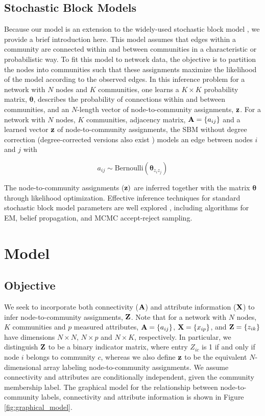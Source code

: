 \documentclass[10pt,journal,compsoc]{IEEEtran}
\begin{document}
\subsection{Stochastic Block Models}
Because our model is an extension to the widely-used stochastic block model \cite{sbmOrig}, we provide a brief introduction here. This model assumes that edges within a community are connected within and between communities in a characteristic or probabilistic way. To fit this model to network data, the objective is to partition the nodes into communities such that these assignments maximize the likelihood of the model according to the observed edges. In this inference problem for a network with $N$ nodes and $K$ communities, one learns a $K \times K$ probability matrix, ${\boldsymbol \theta}$, describes the probability of connections within and between communities, and an $N$-length vector of node-to-community assignments, ${\bf z}$. For a network with $N$ nodes, $K$ communities, adjacency matrix, ${\bf A}=\{a_{ij}\}$ and a learned vector ${\bf z}$ of node-to-community assignments, the SBM without degree correction (degree-corrected versions also exist \cite{degreeCorrect}) models an edge between nodes $i$ and $j$ with

\begin{equation}
a_{ij} \sim \text{Bernoulli}(\boldsymbol \theta_{z_{i}z_{j}})
\end{equation}

The node-to-community assignments (${\bf z})$ are inferred together with the matrix ${\boldsymbol \theta}$ through likelihood optimization. Effective inference techniques for standard stochastic block model parameters are well explored \cite{comparative,tiagomcmc,dudin}, including algorithms for EM, belief propagation, and MCMC accept-reject sampling. 

\section{Model}
\subsection{Objective}
We seek to incorporate both connectivity (${\bf A}$) and attribute information (${\bf X}$) to infer node-to-community assignments, ${\bf Z}$. Note that for a network with $N$ nodes, $K$ communities and $p$ measured attributes, ${\bf A}=\{a_{ij}\}$, ${\bf X}=\{x_{ip}\}$, and ${\bf Z}=
\{z_{ik}\}$ have dimensions $N \times N$, $N \times p$ and $N \times K$, respectively. In particular, we distinguish ${\bf Z}$ to be a binary indicator matrix, where entry $Z_{ic}$ is 1 if and only if node $i$ belongs to community $c$, whereas we also define ${\bf z}$ to be the equivalent $N$-dimensional array labeling node-to-community assignments. We assume connectivity and attributes are conditionally independent, given the community membership label. The graphical model for the relationship between node-to-community labels, connectivity and attribute information is shown in Figure \ref{fig:graphical_model}.
\end{document}
